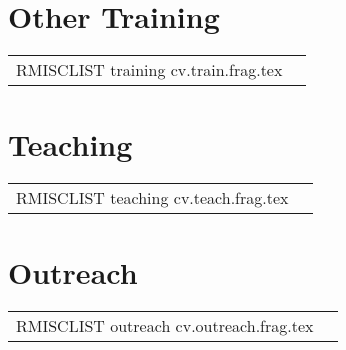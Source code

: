 \documentclass[letterpaper,11pt]{article}
\makeatletter
\newlength{\datewidth} \datewidth=14ex
\newlength{\descwidth} \descwidth=\textwidth
\newenvironment{mytable}{
  \begin{longtable}{@{}p{\datewidth}>{\raggedright}p{\descwidth}}
}{
  \end{longtable}
}
\makeatother
\begin{document}

\section*{Other Training}
\begin{mytable}
RMISCLIST training cv.train.frag.tex
\end{mytable}

\section*{Teaching}
\begin{mytable}
RMISCLIST teaching cv.teach.frag.tex
\end{mytable}

\section*{Outreach}
\begin{mytable}
RMISCLIST outreach cv.outreach.frag.tex
\end{mytable}
\end{document}
